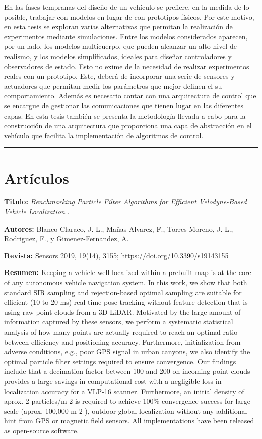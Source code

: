 En las fases tempranas del diseño de un vehículo se prefiere, en la medida de lo posible, trabajar con modelos en lugar de con prototipos físicos. Por este motivo, en esta tesis se exploran varias alternativas que permitan la realización de experimentos mediante simulaciones. Entre los modelos considerados aparecen, por un lado, los modelos multicuerpo, que pueden alcanzar un alto nivel de realismo, y los modelos simplificados, ideales para diseñar controladores y observadores de estado. Esto no exime de la necesidad de realizar experimentos reales con un prototipo. Este, deberá de incorporar una serie de sensores y actuadores que permitan medir los parámetros que mejor definen el su comportamiento. Además es necesario contar con una arquitectura de control que se encargue de gestionar las comunicaciones que tienen lugar en las diferentes capas. En esta tesis también se presenta la metodología llevada a cabo para la construcción de una arquitectura que proporciona una capa de abstracción en el vehículo que facilita la implementación de algoritmos de control.
 
\vspace{6pt} \hrule \vspace{6pt}
\section{Artículos}
\textbf{Titulo:} \textit{Benchmarking Particle Filter Algorithms for Efficient Velodyne-Based Vehicle Localization} \cite{blanco2019benchmarking}.

\textbf{Autores:} Blanco-Claraco, J. L., Mañas-Alvarez, F., Torres-Moreno, J. L., Rodriguez, F., y Gimenez-Fernandez, A.

\textbf{Revista:} Sensors 2019, 19(14), 3155; \url{https://doi.org/10.3390/s19143155}

\textbf{Resumen:} Keeping a vehicle well-localized within a prebuilt-map is at the core of any autonomous vehicle navigation system. In this work, we show that both standard SIR sampling and rejection-based optimal sampling are suitable for efficient (10 to 20 ms) real-time pose tracking without feature detection that is using raw point clouds from a 3D LiDAR. Motivated by the large amount of information captured by these sensors, we perform a systematic statistical analysis of how many points are actually required to reach an optimal ratio between efficiency and positioning accuracy. Furthermore, initialization from adverse conditions, e.g., poor GPS signal in urban canyons, we also identify the optimal particle filter settings required to ensure convergence. Our findings include that a decimation factor between 100 and 200 on incoming point clouds provides a large savings in computational cost with a negligible loss in localization accuracy for a VLP-16 scanner. Furthermore, an initial density of aprox. 2 particles/m 2 is required to achieve 100\% convergence success for large-scale (aprox. 100,000 m 2 ), outdoor global localization without any additional hint from GPS or magnetic field sensors. All implementations have been released as open-source software.

